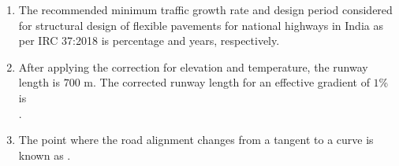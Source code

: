 \documentclass[journal,12pt,onecolumn]{article}
\theoremstyle{remark}
\begin{document}
\begin{enumerate}
    \item The recommended minimum traffic growth rate and design period considered for structural design of flexible pavements for national highways in India as per IRC 37:2018 is \underline{\hspace{1cm}} percentage and \underline{\hspace{1cm}} years, respectively.

    \hfill{}
    \begin{enumerate}
    \end{enumerate}

    \item After applying the correction for elevation and temperature, the runway length is $700$ m. The corrected runway length  for an effective gradient of $1$\% is \underline{\hspace{2cm}} \\ .

    \hfill{}
    \begin{enumerate}
    \end{enumerate}

    \item The point where the road alignment changes from a tangent to a curve is known as \underline{\hspace{2cm}}.

    \hfill{}
    \begin{enumerate}
    \end{enumerate}


\end{enumerate}
\end{document}
